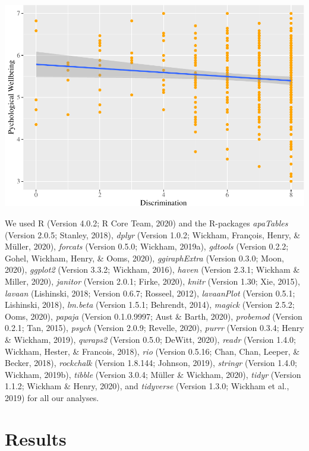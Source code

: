 \documentclass[
  english,
  man,floatsintext]{apa6}
\begin{document}
\includegraphics{prep_script_files/figure-latex/regplot-1.pdf}

We used R (Version 4.0.2; R Core Team, 2020) and the R-packages \emph{apaTables} (Version 2.0.5; Stanley, 2018), \emph{dplyr} (Version 1.0.2; Wickham, François, Henry, \& Müller, 2020), \emph{forcats} (Version 0.5.0; Wickham, 2019a), \emph{gdtools} (Version 0.2.2; Gohel, Wickham, Henry, \& Ooms, 2020), \emph{ggiraphExtra} (Version 0.3.0; Moon, 2020), \emph{ggplot2} (Version 3.3.2; Wickham, 2016), \emph{haven} (Version 2.3.1; Wickham \& Miller, 2020), \emph{janitor} (Version 2.0.1; Firke, 2020), \emph{knitr} (Version 1.30; Xie, 2015), \emph{lavaan} (Lishinski, 2018; Version 0.6.7; Rosseel, 2012), \emph{lavaanPlot} (Version 0.5.1; Lishinski, 2018), \emph{lm.beta} (Version 1.5.1; Behrendt, 2014), \emph{magick} (Version 2.5.2; Ooms, 2020), \emph{papaja} (Version 0.1.0.9997; Aust \& Barth, 2020), \emph{probemod} (Version 0.2.1; Tan, 2015), \emph{psych} (Version 2.0.9; Revelle, 2020), \emph{purrr} (Version 0.3.4; Henry \& Wickham, 2019), \emph{qwraps2} (Version 0.5.0; DeWitt, 2020), \emph{readr} (Version 1.4.0; Wickham, Hester, \& Francois, 2018), \emph{rio} (Version 0.5.16; Chan, Chan, Leeper, \& Becker, 2018), \emph{rockchalk} (Version 1.8.144; Johnson, 2019), \emph{stringr} (Version 1.4.0; Wickham, 2019b), \emph{tibble} (Version 3.0.4; Müller \& Wickham, 2020), \emph{tidyr} (Version 1.1.2; Wickham \& Henry, 2020), and \emph{tidyverse} (Version 1.3.0; Wickham et al., 2019) for all our analyses.

\hypertarget{results}{%
\section{Results}\label{results}}
\end{document}
